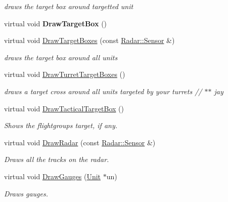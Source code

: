 \begin{DoxyCompactItemize}
\begin{DoxyCompactList}\small\item\em draws the target box around targetted unit \end{DoxyCompactList}\item 
virtual void {\bfseries Draw\+Target\+Box} ()\hypertarget{classCockpit_a3f6b90d520528eaac24b6c5e783fd8fc}{}\label{classCockpit_a3f6b90d520528eaac24b6c5e783fd8fc}

\item 
virtual void \hyperlink{classCockpit_abc76993825a065e7d40b69ae2fa4a3db}{Draw\+Target\+Boxes} (const \hyperlink{classRadar_1_1Sensor}{Radar\+::\+Sensor} \&)\hypertarget{classCockpit_abc76993825a065e7d40b69ae2fa4a3db}{}\label{classCockpit_abc76993825a065e7d40b69ae2fa4a3db}

\begin{DoxyCompactList}\small\item\em draws the target box around all units \end{DoxyCompactList}\item 
virtual void \hyperlink{classCockpit_a4d666d42baa8cef5e187c364df97f71e}{Draw\+Turret\+Target\+Boxes} ()\hypertarget{classCockpit_a4d666d42baa8cef5e187c364df97f71e}{}\label{classCockpit_a4d666d42baa8cef5e187c364df97f71e}

\begin{DoxyCompactList}\small\item\em draws a target cross around all units targeted by your turrets // $\ast$$\ast$ jay \end{DoxyCompactList}\item 
virtual void \hyperlink{classCockpit_a89616f9df4b1d96d3237a483fce19425}{Draw\+Tactical\+Target\+Box} ()\hypertarget{classCockpit_a89616f9df4b1d96d3237a483fce19425}{}\label{classCockpit_a89616f9df4b1d96d3237a483fce19425}

\begin{DoxyCompactList}\small\item\em Shows the flightgroup\textquotesingle{}s target, if any. \end{DoxyCompactList}\item 
virtual void \hyperlink{classCockpit_a49816449cb1a72ce9f431ecdd78e6b5e}{Draw\+Radar} (const \hyperlink{classRadar_1_1Sensor}{Radar\+::\+Sensor} \&)\hypertarget{classCockpit_a49816449cb1a72ce9f431ecdd78e6b5e}{}\label{classCockpit_a49816449cb1a72ce9f431ecdd78e6b5e}

\begin{DoxyCompactList}\small\item\em Draws all the tracks on the radar. \end{DoxyCompactList}\item 
virtual void \hyperlink{classCockpit_a9f8fa6143bf6ef9d1eff8b5c3117ca64}{Draw\+Gauges} (\hyperlink{classUnit}{Unit} $\ast$un)\hypertarget{classCockpit_a9f8fa6143bf6ef9d1eff8b5c3117ca64}{}\label{classCockpit_a9f8fa6143bf6ef9d1eff8b5c3117ca64}

\begin{DoxyCompactList}\small\item\em Draws gauges. \end{DoxyCompactList}\end{DoxyCompactItemize}
